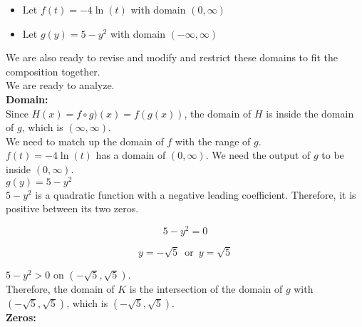 \documentclass{ximera}
\begin{document}
\begin{itemize}
\item Let $f(t) = -4 \ln(t)$ with domain $(0, \infty)$ \\
\item Let $g(y) = 5 - y^2$ with domain $(-\infty, \infty)$ \\
\end{itemize}

We are also ready to revise and modify and restrict these domains to fit the composition together. \\




We are ready to analyze. \\




\textbf{\textcolor{blue!55!black}{Domain:}} \\



Since $H(x) = f \circ g)(x) = f(g(x))$, the domain of $H$ is inside the domain of $g$, which is $(\infty, \infty)$. \\

We need to match up the domain of $f$ with the range of $g$. \\


$f(t) = -4 \ln(t)$ has a domain of $(0, \infty)$.  We need the output of $g$ to be inside $(0, \infty)$. \\



$g(y) = 5 - y^2$ \\



$5 - y^2$ is a quadratic function with a negative leading coefficient.  Therefore, it is positive between its two zeros.


\[
5 - y^2 = 0
\]

\[
y = -\sqrt{5}  \,  \text{ or } \, y = \sqrt{5} 
\]




$5 - y^2 > 0$ on $(-\sqrt{5}, \sqrt{5})$. \\




Therefore, the domain of $K$ is the intersection of the domain of $g$ with $(-\sqrt{5}, \sqrt{5})$, which is $(-\sqrt{5}, \sqrt{5})$. \\



\textbf{\textcolor{blue!55!black}{Zeros:}} \\
\end{document}
